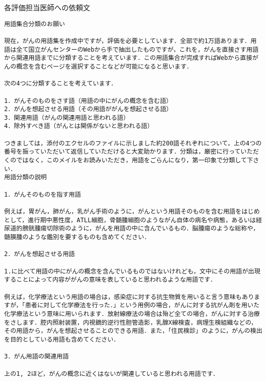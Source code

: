 \documentclass[japanese]{jnlp_1.4}
\begin{document}
\vspace{3\baselineskip}
\begin{boiteepaisseavecuntitre}{各評価担当医師への依頼文}
\begin{verbatim}
用語集合分類のお願い

現在，がんの用語集を作成中ですが，評価を必要としています．全部で約1万語あります．用語は全て国立がんセンターのWebから手で抽出したものですが，これを，がんを直接さす用語から関連用語までに分類することを考えています．この用語集合が完成すればWebから直接がんの概念を含むページを選択することなどが可能になると思います．

次の4つに分類することを考えています．

1．がんそのものをさす語（用語の中にがんの概念を含む語）
2．がんを想起させる用語（その用語ががんを想起させる語）
3．関連用語（がんの関連用語と思われる語）
4．除外すべき語（がんとは関係がないと思われる語）

つきましては，添付のエクセルのファイルに示しました約200語それぞれについて，上の4つの番号を振っていただいて返信していただけると大変助かります．分類は，厳密に行っていただくのではなく，このメイルをお読みいただき，用語をごらんになり，第一印象で分類して下さい．
用語分類の説明

1．がんそのものを指す用語

例えば，胃がん，肺がん，乳がん手術のように，がんという用語そのものを含む用語をはじめとして，進行期中悪性度，ATLL細胞，骨髄腫細胞のようながん自体の病名や病態，あるいは経尿道的膀胱腫瘍切除術のように，がんを用語の中に含んでいるもの．脳腫瘍のような総称や，髄膜腫のような鑑別を要するものも含めてください．

2．がんを想起させる用語

1.に比べて用語の中にがんの概念を含んでいるものではないけれども，文中にその用語が出現することによって内容ががんの意味を表していると思われるような用語です．

例えば，化学療法という用語の場合は，感染症に対する抗生物質を用いると言う意味もありますが，「患者に対して化学療法を行った．」という用例の場合，がんに対する抗がん剤を用いた化学療法という意味に用いられます．放射線療法の場合は殆ど全ての場合，がんに対する治療をさします．腔内照射装置，内視鏡的逆行性胆管造影，乳腺X線検査，病理生検組織などの，その用語から，がんを想起させることのできる用語．また，「住民検診」のように，がんの検出を目的としている用語も含めてください．

3．がん用語の関連用語

上の1, 2ほど，がんの概念に近くはないが関連していると思われる用語です．


\end{verbatim}
\end{boiteepaisseavecuntitre}
\end{document}
